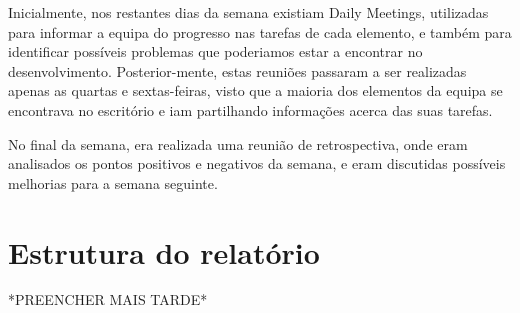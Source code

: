 Inicialmente, nos restantes dias da semana existiam Daily Meetings, utilizadas para informar a equipa do progresso nas tarefas de cada elemento, e também para identificar possíveis problemas que poderiamos estar a encontrar no desenvolvimento. Posterior-mente, estas reuniões passaram a ser realizadas apenas as quartas e sextas-feiras, visto que a maioria dos elementos da equipa se encontrava no escritório e iam partilhando informações acerca das suas tarefas.

No final da semana, era realizada uma reunião de retrospectiva, onde eram analisados os pontos positivos e negativos da semana, e eram discutidas possíveis melhorias para a semana seguinte.

\section{Estrutura do relatório}
*PREENCHER MAIS TARDE*